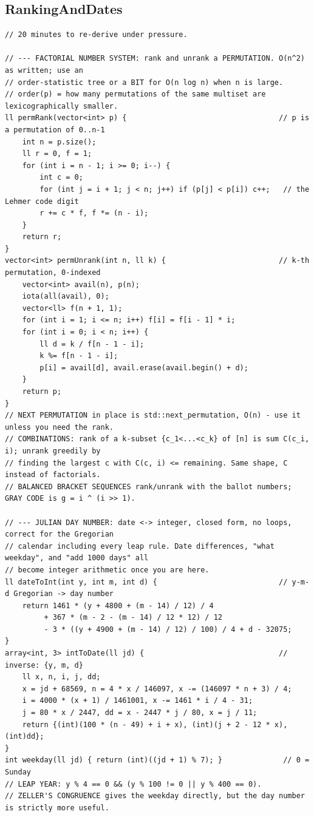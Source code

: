 \documentclass[9pt,a4paper,twocolumn]{extarticle}
\begin{document}
\subsection{RankingAndDates}
\nopagebreak
\begin{lstlisting}
// 20 minutes to re-derive under pressure.

// --- FACTORIAL NUMBER SYSTEM: rank and unrank a PERMUTATION. O(n^2) as written; use an
// order-statistic tree or a BIT for O(n log n) when n is large.
// order(p) = how many permutations of the same multiset are lexicographically smaller.
ll permRank(vector<int> p) {                                   // p is a permutation of 0..n-1
    int n = p.size();
    ll r = 0, f = 1;
    for (int i = n - 1; i >= 0; i--) {
        int c = 0;
        for (int j = i + 1; j < n; j++) if (p[j] < p[i]) c++;   // the Lehmer code digit
        r += c * f, f *= (n - i);
    }
    return r;
}
vector<int> permUnrank(int n, ll k) {                          // k-th permutation, 0-indexed
    vector<int> avail(n), p(n);
    iota(all(avail), 0);
    vector<ll> f(n + 1, 1);
    for (int i = 1; i <= n; i++) f[i] = f[i - 1] * i;
    for (int i = 0; i < n; i++) {
        ll d = k / f[n - 1 - i];
        k %= f[n - 1 - i];
        p[i] = avail[d], avail.erase(avail.begin() + d);
    }
    return p;
}
// NEXT PERMUTATION in place is std::next_permutation, O(n) - use it unless you need the rank.
// COMBINATIONS: rank of a k-subset {c_1<...<c_k} of [n] is sum C(c_i, i); unrank greedily by
// finding the largest c with C(c, i) <= remaining. Same shape, C instead of factorials.
// BALANCED BRACKET SEQUENCES rank/unrank with the ballot numbers; GRAY CODE is g = i ^ (i >> 1).

// --- JULIAN DAY NUMBER: date <-> integer, closed form, no loops, correct for the Gregorian
// calendar including every leap rule. Date differences, "what weekday", and "add 1000 days" all
// become integer arithmetic once you are here.
ll dateToInt(int y, int m, int d) {                            // y-m-d Gregorian -> day number
    return 1461 * (y + 4800 + (m - 14) / 12) / 4
         + 367 * (m - 2 - (m - 14) / 12 * 12) / 12
         - 3 * ((y + 4900 + (m - 14) / 12) / 100) / 4 + d - 32075;
}
array<int, 3> intToDate(ll jd) {                               // inverse: {y, m, d}
    ll x, n, i, j, dd;
    x = jd + 68569, n = 4 * x / 146097, x -= (146097 * n + 3) / 4;
    i = 4000 * (x + 1) / 1461001, x -= 1461 * i / 4 - 31;
    j = 80 * x / 2447, dd = x - 2447 * j / 80, x = j / 11;
    return {(int)(100 * (n - 49) + i + x), (int)(j + 2 - 12 * x), (int)dd};
}
int weekday(ll jd) { return (int)((jd + 1) % 7); }              // 0 = Sunday
// LEAP YEAR: y % 4 == 0 && (y % 100 != 0 || y % 400 == 0).
// ZELLER'S CONGRUENCE gives the weekday directly, but the day number is strictly more useful.


\end{lstlisting}
\end{document}
